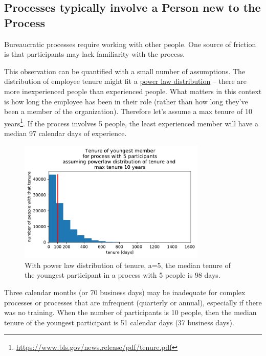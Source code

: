 \subsection*{Processes typically involve a Person new to the Process}

Bureaucratic processes require working with other people. One source of friction is that participants may lack familiarity with the process. 

This observation can be quantified with a small number of assumptions. The distribution of employee tenure might fit a \href{https://en.wikipedia.org/wiki/Power_law}{power law distribution} -- there are more inexperienced people than experienced people. What matters in this context is how long the employee has been in their role (rather than how long they've been a member of the organization). Therefore let's assume a max tenure of 10 years\footnote{\href{https://www.bls.gov/news.release/pdf/tenure.pdf}{https://www.bls.gov/news.release/pdf/tenure.pdf}}. If the process involves 5 people, the least experienced member will have a median 97 calendar days of experience.

\begin{figure}[H]
    \centering
    \includegraphics[width=0.8\textwidth]{images/tenure_power_distribution_a5_with_max_tenure10_and_5_participants.pdf}
    \caption{With power law distribution of tenure, a=5,
the median tenure of the youngest participant
 in a process with 5 people is 98 days.}
    \label{fig:tenure-powerlaw-5-participants-tenure10}
\end{figure}


Three calendar months (or 70 business days) may be inadequate for complex processes or processes that are infrequent (quarterly or annual), especially if there was no training. When the number of participants is 10 people, then the median tenure of the youngest participant is 51 calendar days (37 business days).



